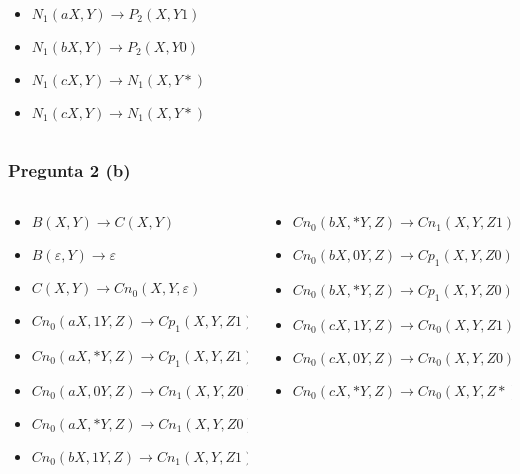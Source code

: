 \documentclass{beamer}
\begin{document}
\begin{frame}
\begin{columns}
\begin{column}{0.48\textwidth}
\begin{itemize}
                \item $N_1(aX,Y)\to P_2(X,Y1)$
                \item $N_1(bX,Y)\to P_2(X,Y0)$
                \item $N_1(cX,Y)\to N_1(X,Y*)$
                \item $N_1(cX,Y)\to N_1(X,Y*)$
            \end{itemize}
        \end{column}
        
    \end{columns}
\end{frame}

\begin{frame}
    \frametitle{Pregunta 2 (b)}
    
    \begin{columns}
        \begin{column}{0.5\textwidth}
            \begin{itemize}
                \item $B(X,Y)\to C(X,Y)$
                \item $B(\varepsilon,Y)\to\varepsilon$
                      
                \item $C(X,Y)\to Cn_0(X,Y,\varepsilon)$
                      
                \item $Cn_0(aX,1Y,Z) \to Cp_1(X,Y,Z1)$
                \item $Cn_0(aX,*Y,Z) \to Cp_1(X,Y,Z1)$
                \item $Cn_0(aX,0Y,Z) \to Cn_1(X,Y,Z0)$
                \item $Cn_0(aX,*Y,Z) \to Cn_1(X,Y,Z0)$
                \item $Cn_0(bX,1Y,Z) \to Cn_1(X,Y,Z1)$
                      
                      
            \end{itemize}
        \end{column}
        \begin{column}{0.5\textwidth}
            \begin{itemize}
                \item $Cn_0(bX,*Y,Z) \to Cn_1(X,Y,Z1)$
                \item $Cn_0(bX,0Y,Z) \to Cp_1(X,Y,Z0)$
                \item $Cn_0(bX,*Y,Z) \to Cp_1(X,Y,Z0)$
                \item $Cn_0(cX,1Y,Z) \to Cn_0(X,Y,Z1)$
                \item $Cn_0(cX,0Y,Z) \to Cn_0(X,Y,Z0)$
                \item $Cn_0(cX,*Y,Z) \to Cn_0(X,Y,Z*)$
            \end{itemize}
        \end{column}
    \end{columns}
\end{frame}
\end{document}
